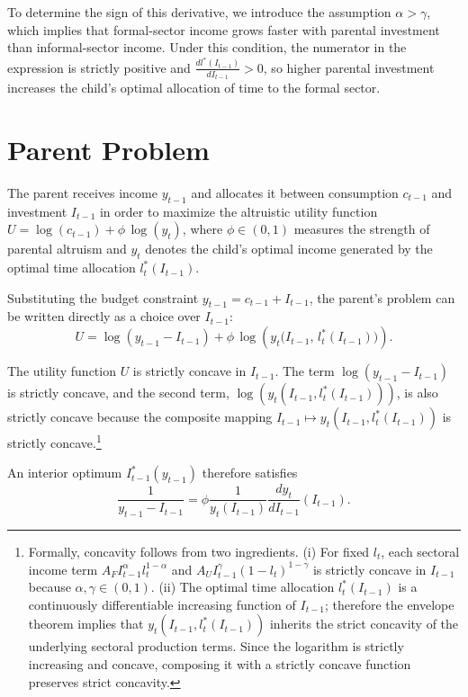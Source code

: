 \documentclass[12pt]{article}
\begin{document}
To determine the sign of this derivative, we introduce the assumption 
$\alpha > \gamma$, which implies that formal-sector income grows faster with 
parental investment than informal-sector income. Under this condition, the 
numerator in the expression is strictly positive and 
$\frac{d l^*(I_{t-1})}{d I_{t-1}} > 0$, so higher parental investment increases 
the child's optimal allocation of time to the formal sector.

\section*{Parent Problem}

The parent receives income $y_{t-1}$ and allocates it between consumption $c_{t-1}$ and investment $I_{t-1}$ in order to maximize the altruistic utility function $U=\log(c_{t-1})+\phi\,\log\!\left(y_t\right)$, where $\phi\in(0,1)$ measures the strength of parental altruism and $y_t$ denotes the child’s optimal income generated by the optimal time allocation $l_t^*(I_{t-1})$.

Substituting the budget constraint $y_{t-1} =c_{t-1} + I_{t-1}$, the parent’s problem can be written directly as a choice over $I_{t-1}$:
\[
U
=
\log\!\left(y_{t-1}-I_{t-1}\right)
+
\phi\,\log\!\left(
y_t\big(I_{t-1},\, l_t^*(I_{t-1})\big)
\right).
\]

The utility function $U$ is strictly concave in $I_{t-1}$. The term $\log(y_{t-1}-I_{t-1})$ is strictly concave, and the second term, $\log\!\left(y_t(I_{t-1},l_t^*(I_{t-1}))\right)$, is also strictly concave because the composite mapping $I_{t-1} \mapsto y_t(I_{t-1},l_t^*(I_{t-1}))$ is strictly concave.\footnote{Formally, concavity follows from two ingredients.  
(i) For fixed $l_t$, each sectoral income term $A_F I_{t-1}^{\alpha}l_t^{1-\alpha}$ and $A_U I_{t-1}^{\gamma}(1-l_t)^{1-\gamma}$ is strictly concave in $I_{t-1}$ because $\alpha,\gamma\in(0,1)$.  
(ii) The optimal time allocation $l_t^*(I_{t-1})$ is a continuously differentiable increasing function of $I_{t-1}$; therefore the envelope theorem implies that $y_t(I_{t-1},l_t^*(I_{t-1}))$ inherits the strict concavity of the underlying sectoral production terms. Since the logarithm is strictly increasing and concave, composing it with a strictly concave function preserves strict concavity.} 


An interior optimum $I_{t-1}^*(y_{t-1})$ therefore satisfies
\begin{equation}
\frac{1}{y_{t-1} - I_{t-1}}
=
\phi \frac{1}{y_{t}(I_{t-1})}
\frac{dy_{t}}{dI_{t-1}}(I_{t-1}).
\end{equation}
\end{document}
